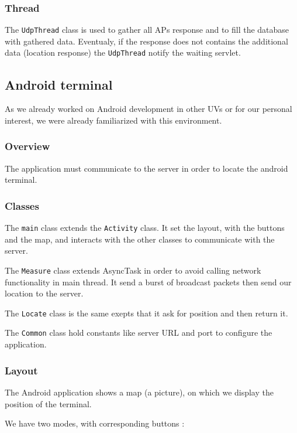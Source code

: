 \subsubsection{Thread}
The \verb+UdpThread+ class is used to gather all APs response and to fill the database with gathered data. Eventualy, if the response does not contains the additional data (location response) the \verb+UdpThread+ notify the waiting servlet.

\newpage
\subsection{Android terminal}

As we already worked on Android development in other UVs or for our personal
interest, we were already familiarized with this environment.

\subsubsection{Overview}

The application must communicate to the server in order to locate the android
terminal.

\subsubsection{Classes}

The \verb+main+ class extends the \verb+Activity+ class. It set the layout, with
the buttons and the map, and interacts with the other classes to communicate
with the server.

The \verb+Measure+ class extends AsyncTask in order to avoid calling network functionality in main thread. It send a burst of broadcast packets then send our location to the server. 

The \verb+Locate+ class is the same exepts that it ask for position and then return it.

The \verb+Common+ class hold constants like server URL and port to configure the application.

\subsubsection{Layout}

The Android application shows a map (a picture), on which we display the
position of the terminal.

We have two modes, with corresponding buttons :

